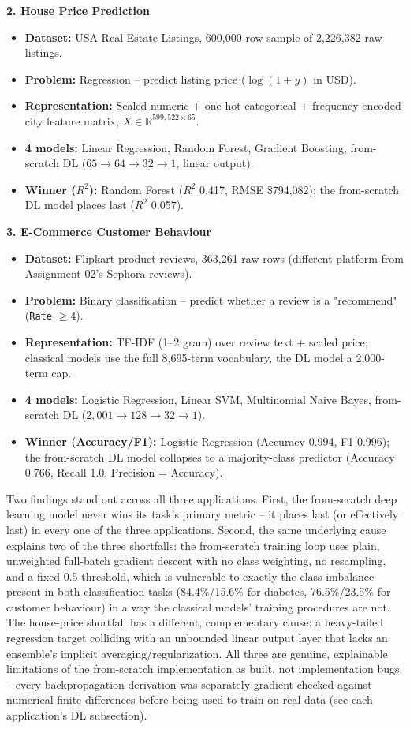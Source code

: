 \documentclass[11pt, a4paper]{article}
\begin{document}
\textbf{2. House Price Prediction}
\begin{itemize}
    \item \textbf{Dataset:} USA Real Estate Listings, 600,000-row sample of 2,226,382 raw
    listings.
    \item \textbf{Problem:} Regression -- predict listing price ($\log(1+y)$ in USD).
    \item \textbf{Representation:} Scaled numeric + one-hot categorical + frequency-encoded
    city feature matrix, $X \in \mathbb{R}^{599,522 \times 65}$.
    \item \textbf{4 models:} Linear Regression, Random Forest, Gradient Boosting,
    from-scratch DL ($65 \to 64 \to 32 \to 1$, linear output).
    \item \textbf{Winner ($R^2$):} Random Forest ($R^2$ 0.417, RMSE \$794,082); the
    from-scratch DL model places last ($R^2$ 0.057).
\end{itemize}

\textbf{3. E-Commerce Customer Behaviour}
\begin{itemize}
    \item \textbf{Dataset:} Flipkart product reviews, 363,261 raw rows (different platform
    from Assignment 02's Sephora reviews).
    \item \textbf{Problem:} Binary classification -- predict whether a review is a
    "recommend" (\texttt{Rate} $\geq 4$).
    \item \textbf{Representation:} TF-IDF (1--2 gram) over review text + scaled price;
    classical models use the full 8,695-term vocabulary, the DL model a 2,000-term cap.
    \item \textbf{4 models:} Logistic Regression, Linear SVM, Multinomial Naive Bayes,
    from-scratch DL ($2{,}001 \to 128 \to 32 \to 1$).
    \item \textbf{Winner (Accuracy/F1):} Logistic Regression (Accuracy 0.994, F1 0.996);
    the from-scratch DL model collapses to a majority-class predictor (Accuracy 0.766,
    Recall 1.0, Precision = Accuracy).
\end{itemize}

Two findings stand out across all three applications. First, the from-scratch deep
learning model never wins its task's primary metric -- it places last (or effectively
last) in every one of the three applications. Second, the same underlying cause explains
two of the three shortfalls: the from-scratch training loop uses plain, unweighted
full-batch gradient descent with no class weighting, no resampling, and a fixed 0.5
threshold, which is vulnerable to exactly the class imbalance present in both
classification tasks (84.4\%/15.6\% for diabetes, 76.5\%/23.5\% for customer behaviour) in
a way the classical models' training procedures are not. The house-price shortfall has a
different, complementary cause: a heavy-tailed regression target colliding with an
unbounded linear output layer that lacks an ensemble's implicit averaging/regularization.
All three are genuine, explainable limitations of the from-scratch implementation as
built, not implementation bugs -- every backpropagation derivation was separately
gradient-checked against numerical finite differences before being used to train on real
data (see each application's DL subsection).
\end{document}
